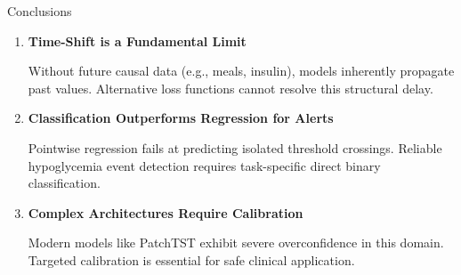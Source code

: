 \begin{frame}[t]{Conclusions}
  \vspace{-10pt}

  \begin{enumerate}
    \setlength{\itemsep}{18pt} %

    \item \textbf{Time-Shift is a Fundamental Limit} \\[2pt]
    { Without future causal data (e.g., meals, insulin), models inherently propagate past values. Alternative loss functions cannot resolve this structural delay.\par}

    \item \textbf{Classification Outperforms Regression for Alerts} \\[2pt]
    { Pointwise regression fails at predicting isolated threshold crossings. Reliable hypoglycemia event detection requires task-specific direct binary classification.\par}

    \item \textbf{Complex Architectures Require Calibration} \\[2pt]
    { Modern models like PatchTST exhibit severe overconfidence in this domain. Targeted calibration is essential for safe clinical application.\par}

  \end{enumerate}
\end{frame}
